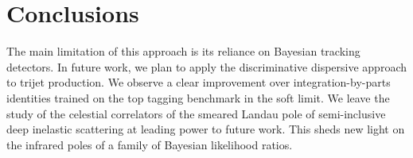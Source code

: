 \section{Conclusions}\label{sec:conclusions}

The main limitation of this approach is its reliance on Bayesian
tracking detectors. In future work, we plan to apply the discriminative
dispersive approach to trijet production. We observe a clear improvement
over integration-by-parts identities trained on the top tagging
benchmark in the soft limit. We leave the study of the celestial
correlators of the smeared Landau pole of semi-inclusive deep inelastic
scattering at leading power to future work. This sheds new light on the
infrared poles of a family of Bayesian likelihood ratios.

